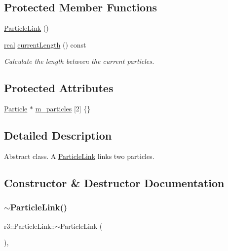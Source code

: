 \subsection*{Protected Member Functions}
\begin{DoxyCompactItemize}
\item 
\mbox{\hyperlink{classr3_1_1_particle_link_adc17e9225ff4f49803f5d5fe0a117af2}{Particle\+Link}} ()
\item 
\mbox{\hyperlink{namespacer3_ab2016b3e3f743fb735afce242f0dc1eb}{real}} \mbox{\hyperlink{classr3_1_1_particle_link_a5ad76e8eb6f9b78e3589c74e5d5013fc}{current\+Length}} () const
\begin{DoxyCompactList}\small\item\em Calculate the length between the current particles. \end{DoxyCompactList}\end{DoxyCompactItemize}
\subsection*{Protected Attributes}
\begin{DoxyCompactItemize}
\item 
\mbox{\hyperlink{classr3_1_1_particle}{Particle}} $\ast$ \mbox{\hyperlink{classr3_1_1_particle_link_a2794d7fe45d905d9c11bb79be3d8e3c8}{m\+\_\+particles}} \mbox{[}2\mbox{]} \{\}
\end{DoxyCompactItemize}


\subsection{Detailed Description}
Abstract class. A \mbox{\hyperlink{classr3_1_1_particle_link}{Particle\+Link}} links two particles. 

\subsection{Constructor \& Destructor Documentation}
\mbox{\label{classr3_1_1_particle_link_a4477af9dbe9041010985492df2656e55}} 
\subsubsection{\texorpdfstring{$\sim$\+Particle\+Link()}{~ParticleLink()}}
{\footnotesize\ttfamily r3\+::\+Particle\+Link\+::$\sim$\+Particle\+Link (\begin{DoxyParamCaption}{ }\end{DoxyParamCaption})\hspace{0.3cm}{\ttfamily [virtual]}, {\ttfamily [default]}}

